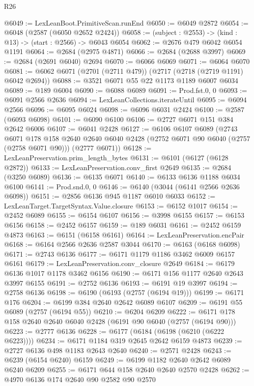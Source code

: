 \begin{lexlean}{R26}
\begin{coremodule}
@6049 := LexLeanBoot.PrimitiveScan.runEnd
@6050 := @6049 @2872
@6054 := @6048 (@2587 (@6050 @2652 @2424))
@6058 := (subject : @2553) -> (kind : @13) -> (start : @2566) -> @6043 @6054
@6062 := @2676 @479 @6042 @6054 @1191
@6064 := @2684 (@2975 @4871)
@6066 := @2684 (@2688 @3997)
@6069 := @2684 (@2691 @6040) @2694
@6070 := @6066 @6069
@6071 := @6064 @6070
@6081 := @6062 @6071 (@2701 (@2711 @479)) (@2717 (@2718 (@2719 @1191) @6042 @2694))
@6088 := @3521 @6071 @55 @22 @1173 @1189 @6007 @6034
@6089 := @189 @6004
@6090 := @6088 @6089
@6091 := Prod.fst.{0, 0}
@6093 := @6091 @2566 @2636
@6094 := LexLeanCollections.iterateUntil
@6095 := @6094 @2566
@6096 := @6095 @6024
@6098 := @6096 @6031 @2424
@6100 := @2587 (@6093 @6098)
@6101 := @6090 @6100
@6106 := @2727 @6071 @151 @384 @2642 @6006
@6107 := @6041 @2428
@6127 := @6106
    @6107
    @6089
    (@2743
      @6071
      @178
      @158
      @2640
      @2640
      @6040
      @2428
      (@2752 @6071 @90 @6040 (@2757 (@2758 @6071 @90)))
      (@2777 @6071))
@6128 := LexLeanPreservation.prim_length_bytes
@6131 := @6101 (@6127 (@6128 @2872))
@6133 := LexLeanPreservation.conv_first @2649
@6135 := @2684 (@3250 @6089)
@6136 := @6135 @6071
@6140 := @6133 @6136 @1188 @6034 @6100
@6141 := Prod.snd.{0, 0}
@6146 := @6140 (@3044 (@6141 @2566 @2636 @6098))
@6151 := @2856 @6136 @945 @1187 @6010 @6033
@6152 := LexLeanTarget.TargetSyntax.Value.closure
@6153 := @6152 @1017
@6154 := @2452 @6089
@6155 := @6154 @6107
@6156 := @3998 @6155
@6157 := @6153 @6156
@6158 := @2452 @6157
@6159 := @189 @6031
@6161 := @2452 @6159 @4873
@6163 := @6151 (@6158 @6161)
@6164 := LexLeanPreservation.encPair
@6168 := @6164 @2566 @2636 @2587 @3044
@6170 := @6163 (@6168 @6098)
@6171 := @2743 @6136
@6177 := @6171 @1179 @1186 @3462 @6009 @6157 @6161
@6179 := LexLeanPreservation.conv_closure @2649
@6184 := @6179 @6136 @1017 @1178 @3462 @6156
@6190 := @6171 @156 @1177 @2640 @2643 @3997 @6155
@6191 := @2752 @6136
@6193 := @6191 @19 @3997
@6194 := @2758 @6136
@6198 := @6190 (@6193 (@2757 (@6194 @19)))
@6199 := @6171 @176
@6204 := @6199 @384 @2640 @2642 @6089 @6107
@6209 := @6191 @55 @6089 (@2757 (@6194 @55))
@6210 := @6204 @6209
@6222 := @6171 @178 @158 @2640 @2640 @6040 @2428 (@6191 @90 @6040 (@2757 (@6194 @90)))
@6223 := @2777 @6136
@6228 := @6177 (@6184 (@6198 (@6210 (@6222 @6223))))
@6234 := @6171 @1184 @319 @2645 @2642 @6159 @4873
@6239 := @2727 @6136 @498 @1183 @2643 @2640
@6240 := @2571 @2428
@6243 := @6239 (@6154 @6240) @6159
@6249 := @6199 @1182 @2640 @2642 @6089 @6240 @6209
@6255 := @6171 @644 @158 @2640 @2640 @2570 @2428
@6262 := @4970 @6136 @174 @2640 @90 @2582 @90 @2570

\end{coremodule}
\end{lexlean}
